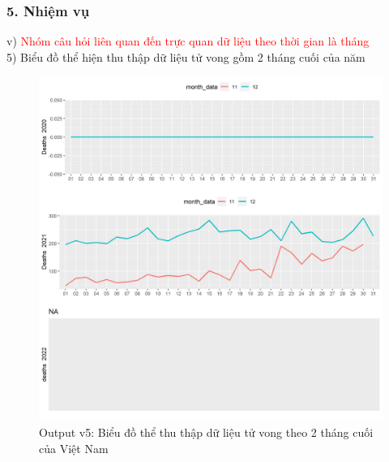 \documentclass[english,10pt,table]{beamer}
\begin{document}
\begin{frame}[fragile]
\frametitle{5.  Nhiệm vụ}
v) \textcolor{red}{Nhóm câu hỏi liên quan đến trực quan dữ liệu theo thời gian là tháng}\\
    5) Biểu đồ thể hiện thu thập dữ liệu tử vong gồm 2 tháng cuối của năm
	\begin{figure}[h!]
	\begin{center}
		    \includegraphics[scale = 0.25]{Images/V/v5 Vietnam .jpeg}
		     \caption{Output v5: Biểu đồ thể thu thập dữ liệu tử vong theo 2 tháng cuối của Việt Nam}
		\end{center}
		\end{figure}
\end{frame}
\end{document}
